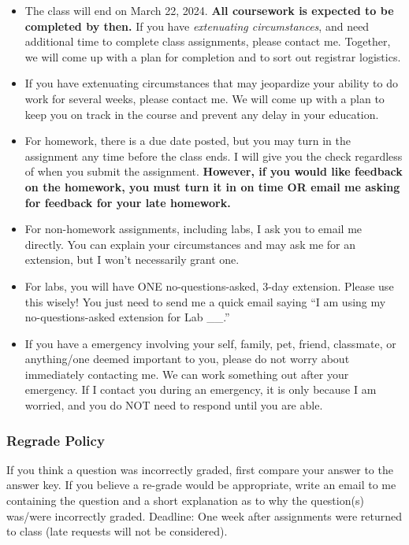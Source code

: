 \documentclass[
  letterpaper,
  DIV=11,
  numbers=noendperiod]{scrartcl}
\begin{document}
\begin{itemize}
\item
  The class will end on March 22, 2024. \textbf{All coursework is
  expected to be completed by then.} If you have \emph{extenuating
  circumstances}, and need additional time to complete class
  assignments, please contact me. Together, we will come up with a plan
  for completion and to sort out registrar logistics.
\item
  If you have extenuating circumstances that may jeopardize your ability
  to do work for several weeks, please contact me. We will come up with
  a plan to keep you on track in the course and prevent any delay in
  your education.
\item
  For homework, there is a due date posted, but you may turn in the
  assignment any time before the class ends. I will give you the check
  regardless of when you submit the assignment. \textbf{However, if you
  would like feedback on the homework, you must turn it in on time OR
  email me asking for feedback for your late homework.}
\item
  For non-homework assignments, including labs, I ask you to email me
  directly. You can explain your circumstances and may ask me for an
  extension, but I won't necessarily grant one.
\item
  For labs, you will have ONE no-questions-asked, 3-day extension.
  Please use this wisely! You just need to send me a quick email saying
  ``I am using my no-questions-asked extension for Lab \_\_.''
\item
  If you have a emergency involving your self, family, pet, friend,
  classmate, or anything/one deemed important to you, please do not
  worry about immediately contacting me. We can work something out after
  your emergency. If I contact you during an emergency, it is only
  because I am worried, and you do NOT need to respond until you are
  able.~
\end{itemize}

\hypertarget{regrade-policy}{%
\subsubsection{Regrade Policy}\label{regrade-policy}}

If you think a question was incorrectly graded, first compare your
answer to the answer key. If you believe a re-grade would be
appropriate, write an email to me containing the question and a short
explanation as to why the question(s) was/were incorrectly graded.
Deadline: One week after assignments were returned to class (late
requests will not be considered).
\end{document}
